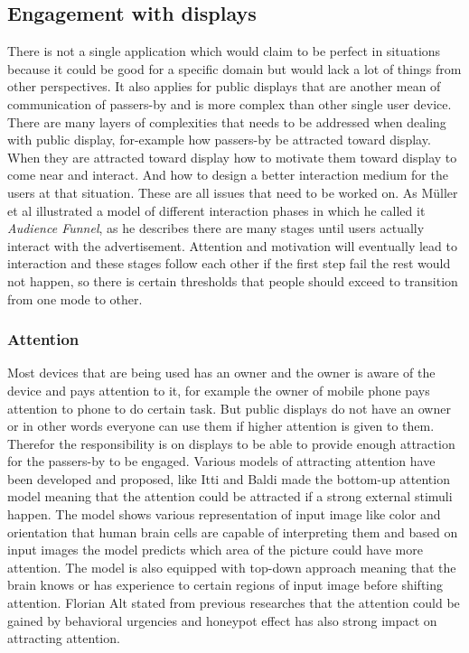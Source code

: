 \subsection{Engagement with displays}
There is not a single application which would claim to be perfect in situations because it could be good for a specific domain but would lack a lot of things from other perspectives. It also applies for public displays that are another mean of communication of passers-by and is more complex than other single user device. There are many layers of complexities that needs to be addressed when dealing with public display, for-example how passers-by be attracted toward display. When they are attracted toward display how to motivate them toward display to come near and interact. And how to design a better interaction medium for the users at that situation. These are all issues that need to be worked on. As Müller et al \cite{DesignSpace} illustrated a model of different interaction phases in which he called it \emph{Audience Funnel}, as he describes there are many stages until users actually interact with the advertisement. Attention and motivation will eventually lead to interaction and these stages follow each other if the first step fail the rest would not happen, so there is certain thresholds that people should exceed to transition from one mode to other. 


\subsubsection{Attention}
Most devices that are being used has an owner and the owner is aware of the device and pays attention to it, for example the owner of mobile phone pays attention to phone to do certain task. But public displays do not have an owner or in other words everyone can use them if higher attention is given to them. Therefor the responsibility is on displays to be able to provide enough attraction for the passers-by to be engaged. 
Various models of attracting attention have been developed and proposed, like Itti and Baldi \cite{attention1} made the bottom-up attention model meaning that the attention could be attracted if a strong external stimuli happen. The model shows various representation of input image like color and orientation that human brain cells are capable of interpreting them and based on input images the model predicts which area of the picture could have more attention. The model is also equipped with top-down approach meaning that the brain knows or has experience to certain regions of input image before shifting attention.  Florian Alt \cite{pervasiv_ad} stated from previous researches that the attention could be gained by behavioral urgencies and honeypot effect has also strong impact on attracting attention.

